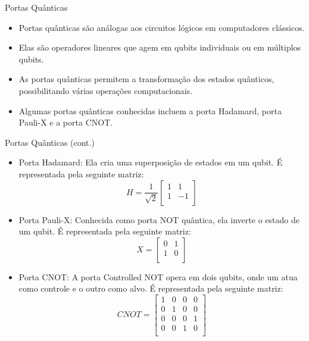 	\begin{frame}{Portas Quânticas}
		\begin{itemize}
			\item Portas quânticas são análogas aos circuitos lógicos em computadores clássicos.
			\item Elas são operadores lineares que agem em qubits individuais ou em múltiplos qubits.
			\item As portas quânticas permitem a transformação dos estados quânticos, possibilitando várias operações computacionais.
			\item Algumas portas quânticas conhecidas incluem a porta Hadamard, porta Pauli-X e a porta CNOT.
		\end{itemize}
	\end{frame}
	
	\begin{frame}{Portas Quânticas (cont.)}
		\begin{itemize}
			\item Porta Hadamard: Ela cria uma superposição de estados em um qubit. É representada pela seguinte matriz:
			\[
			H = \frac{1}{\sqrt{2}}\begin{bmatrix}
				1 & 1 \\
				1 & -1 \\
			\end{bmatrix}
			\]
			\item Porta Pauli-X: Conhecida como porta NOT quântica, ela inverte o estado de um qubit. É representada pela seguinte matriz:
			\[
			X = \begin{bmatrix}
				0 & 1 \\
				1 & 0 \\
			\end{bmatrix}
			\]
			\item Porta CNOT: A porta Controlled NOT opera em dois qubits, onde um atua como controle e o outro como alvo. É representada pela seguinte matriz:
			\[
			CNOT = \begin{bmatrix}
				1 & 0 & 0 & 0 \\
				0 & 1 & 0 & 0 \\
				0 & 0 & 0 & 1 \\
				0 & 0 & 1 & 0 \\
			\end{bmatrix}
			\]
		\end{itemize}
	\end{frame}
	
